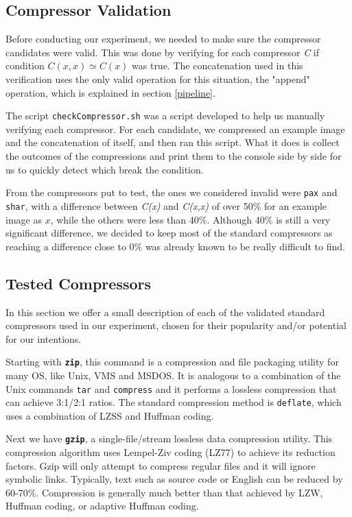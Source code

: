 \documentclass[12pt]{article}
\begin{document}
\subsection{Compressor Validation} \label{validation} %

Before conducting our experiment, we needed to make sure the compressor candidates were valid.
This was done by verifying for each compressor \textit{C} if condition $C(x,x) \simeq C(x)$ was true.
The concatenation used in this verification uses the only valid operation for this situation, the "append" operation, which is explained in section \ref{pipeline}.

The script \texttt{checkCompressor.sh} was a script developed to help us manually verifying each compressor.
For each candidate, we compressed an example image and the concatenation of itself, and then ran this script.
What it does is collect the outcomes of the compressions and print them to the console side by side for us to quickly detect which break the condition.

From the compressors put to test, the ones we considered invalid were \texttt{pax} and \texttt{shar}, with a difference between \textit{C(x)} and \textit{C(x,x)}
of over 50\% for an example image as $x$, while the others were less than 40\%.
Although 40\% is still a very significant difference, we decided to keep most of the standard compressors as reaching a difference close to 0\% was already
known to be really difficult to find.

\subsection{Tested Compressors} %

In this section we offer a small description of each of the validated standard compressors used in our experiment, chosen for their popularity and/or potential for our intentions.

Starting with \textbf{\texttt{zip}}, this command is a compression and file packaging utility for many OS, like Unix, VMS and MSDOS. 
It is analogous to a combination of the Unix commands \texttt{tar} and \texttt{compress} and it performs a lossless compression that can achieve 3:1/2:1 ratios. 
The standard compression method is \texttt{deflate}, which uses a combination of LZSS and Huffman coding.

Next we have \textbf{\texttt{gzip}}, a single-file/stream lossless data compression utility. 
This compression algorithm uses Lempel-Ziv coding (LZ77) to achieve its reduction factors. 
Gzip will only attempt to compress regular files and it will ignore symbolic links. 
Typically, text such as source code or English can be reduced by 60-70\%. 
Compression is generally much better than that achieved by LZW, Huffman coding, or adaptive Huffman coding.
\end{document}
